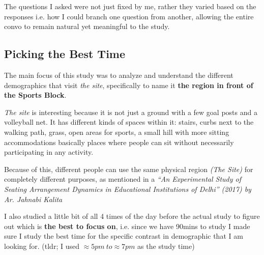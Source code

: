 \documentclass[twocolumn, 12pt]{article}
\begin{document}
The questions I asked were not just fixed by me, rather they varied based on the responses i.e. how I could branch one question from another, 
allowing the entire convo to remain natural yet meaningful to the study.

\subsection{Picking the Best Time}

The main focus of this study was to analyze and understand the different demographics that visit \textit{the site}, specifically to name it \textbf{the region in front of the Sports Block}.

\textit{The site} is interesting because it is not just a ground with a few goal posts and a volleyball net. 
It has different kinds of spaces within it: stairs, curbs next to the walking path, grass, open areas for sports, a small hill with more sitting 
accommodations basically places where people can sit without necessarily participating in any activity. 

Because of this, different people can use the same physical region \textit{(The Site)} for completely different purposes, as mentioned in a 
\textit{``An Experimental Study of Seating Arrangement Dynamics in Educational Institutions of Delhi'' (2017) by Ar. Jahnabi Kalita}\cite{seating}

I also studied a little bit of all 4 times of the day before the actual study 
to figure out which is \textbf{the best to focus on}, 
i.e. since we have 90mins to study I made sure I study the best time for the 
specific contrast in demographic that I am looking for. (tldr; I used $\approx5pm \ to \approx7pm$ as the study time)
\end{document}
